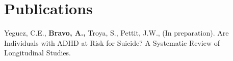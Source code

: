 \documentclass[11pt,a4paper,]{awesome-cv}
\begin{document}
\hypertarget{publications}{%
\section{Publications}\label{publications}}

Yeguez, C.E., \textbf{Bravo, A.,} Troya, S., Pettit, J.W., (In
preparation). Are Individuals with ADHD at Risk for Suicide? A
Systematic Review of Longitudinal Studies.


\label{LastPage}~
\end{document}
